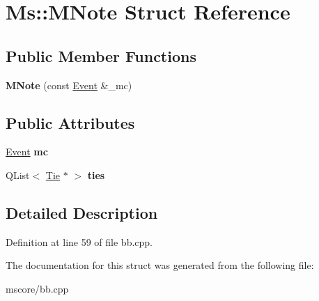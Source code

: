 \hypertarget{struct_ms_1_1_m_note}{}\section{Ms\+:\+:M\+Note Struct Reference}
\label{struct_ms_1_1_m_note}
\subsection*{Public Member Functions}
\begin{DoxyCompactItemize}
\item 
\mbox{\label{struct_ms_1_1_m_note_aaaf2d149430d709231dde21fa54065ec}} 
{\bfseries M\+Note} (const \hyperlink{class_ms_1_1_event}{Event} \&\+\_\+mc)
\end{DoxyCompactItemize}
\subsection*{Public Attributes}
\begin{DoxyCompactItemize}
\item 
\mbox{\label{struct_ms_1_1_m_note_aa717e8eb4046815f66410a087a014b61}} 
\hyperlink{class_ms_1_1_event}{Event} {\bfseries mc}
\item 
\mbox{\label{struct_ms_1_1_m_note_a8c44376d2742197de04b0bc91e48ac20}} 
Q\+List$<$ \hyperlink{class_ms_1_1_tie}{Tie} $\ast$ $>$ {\bfseries ties}
\end{DoxyCompactItemize}


\subsection{Detailed Description}


Definition at line 59 of file bb.\+cpp.



The documentation for this struct was generated from the following file\+:\begin{DoxyCompactItemize}
\item 
mscore/bb.\+cpp\end{DoxyCompactItemize}
